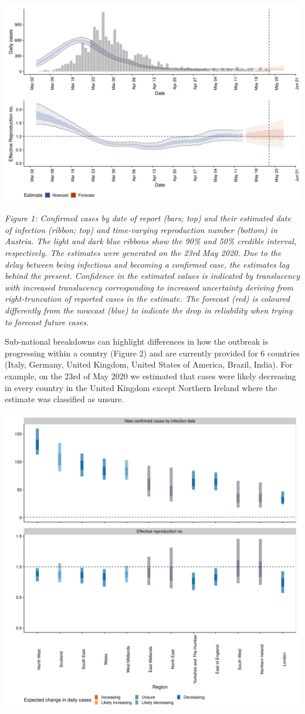 \documentclass[]{article}
\begin{document}
\includegraphics[width=0.9\linewidth]{figures/figure_1}

\emph{Figure 1: Confirmed cases by date of report (bars; top) and their
estimated date of infection (ribbon; top) and time-varying reproduction
number (bottom) in Austria. The light and dark blue ribbons show the
90\% and 50\% credible interval, respectively. The estimates were
generated on the 23rd May 2020. Due to the delay between being
infectious and becoming a confirmed case, the estimates lag behind the
present. Confidence in the estimated values is indicated by translucency
with increased translucency corresponding to increased uncertainty
deriving from right-truncation of reported cases in the estimate. The
forecast (red) is coloured differently from the nowcast (blue) to
indicate the drop in reliability when trying to forecast future cases.}

Sub-national breakdowns can highlight differences in how the outbreak is
progressing within a country (Figure 2) and are currently provided for 6
countries (Italy, Germany, United Kingdom, United States of America,
Brazil, India). For example, on the 23rd of May 2020 we estimated that
cases were likely decreasing in every country in the United Kingdom
except Northern Ireland where the estimate was classified as unsure.

\includegraphics[width=0.9\linewidth]{figures/figure_2}
\end{document}
